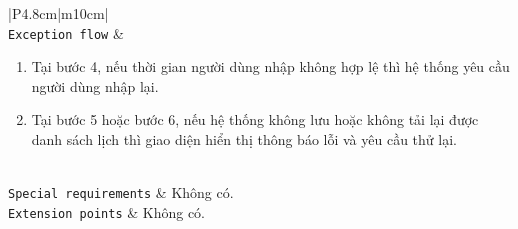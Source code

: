 \begin{longtable}{|P{4.8cm}|m{10cm}|}
	\\
	\hline
	\texttt{Exception flow} &
	\begin{enumerate}[label = E\arabic*:]
		\item Tại bước 4, nếu thời gian người dùng nhập không hợp lệ thì hệ thống yêu cầu người dùng nhập lại.
		\item Tại bước 5 hoặc bước 6, nếu hệ thống không lưu hoặc không tải lại được danh sách lịch thì giao diện hiển thị thông báo lỗi và yêu cầu thử lại.
	\end{enumerate}
	\\
	\hline
	\texttt{Special requirements} & Không có.\\
	\hline
	\texttt{Extension points} & Không có.\\
	\hline

	\caption{\label{table7}Đặc tả cho Use-case Đặt lịch tưới nước tự động}
\end{longtable}
